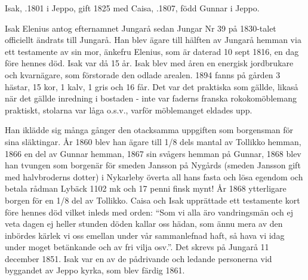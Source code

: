 %
Isak, .1801 i Jeppo, gift 1825 med Caisa, .1807, född Gunnar i Jeppo.
\begin{jhchildren}
  \item {}
  \item {}
  \item {}
  \item {}
  \item {}
  \item {}
  \item {}
  \item {}
  \item {}
\end{jhchildren}
Isak Elenius antog efternamnet Jungarå sedan Jungar Nr 39 på 1830-talet officiellt ändrats till Jungarå. Han blev ägare till hälften av Jungarå hemman via ett testamente av sin mor, änkefru Elenius, som är daterad 10 sept 1816, en dag före hennes död. Isak var då 15 år. Isak blev med åren en energisk jordbrukare och kvarnägare, som förstorade den odlade arealen. 1894 fanns på gården 3 hästar, 15 kor, 1 kalv, 1 gris och 16 får. Det var det praktiska som gällde, likaså när det gällde inredning i bostaden - inte var faderns franska rokokomöblemang praktiskt, stolarna var låga o.s.v., varför möblemanget eldades upp.

Han iklädde sig många gånger den otacksamma uppgiften som borgensman för sina släktingar. År 1860 blev han ägare till 1/8 dels mantal av Tollikko hemman, 1866 en del av Gunnar hemman, 1867 sin svågers hemman på Gunnar, 1868 blev han tvungen 	som borgenär för smeden Jansson på 	Nygårds (smeden Jansson gift med halvbroderns dotter) i Nykarleby överta all hans 	fasta och lösa egendom och betala rådman Lybäck 1102 mk och 17 penni finsk mynt!	År 1868 ytterligare borgen för en 1/8 del av Tollikko. Caisa och Isak upprättade ett testamente kort före hennes död vilket inleds med orden: 	``Som vi alla äro vandringsmän och ej veta dagen ej heller stunden döden kallar oss hädan, som ännu mera av den inbördes kärlek vi oss emellan under vår sammanlefnad haft, så hava vi idag under moget betänkande och av fri vilja osv.''. Det skrevs på 	Jungarå 11 december 1851. Isak var en av de pådrivande och ledande personerna vid byggandet av Jeppo kyrka, som blev 	färdig 1861.

